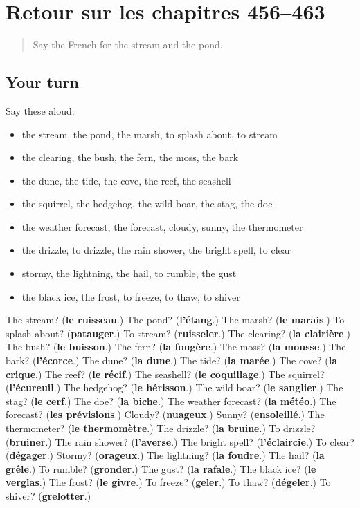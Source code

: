 \section[(dialogue)]{Retour sur les chapitres 456–463}

\label{lesson:FR-R463-revision-456-463}



\begin{quote}
Say the French for the stream and the pond.
\end{quote}

\subsection*{Your turn}
Say these aloud:

\begin{itemize}
\raggedright
  \item the stream, the pond, the marsh, to splash about, to stream
  \item the clearing, the bush, the fern, the moss, the bark
  \item the dune, the tide, the cove, the reef, the seashell
  \item the squirrel, the hedgehog, the wild boar, the stag, the doe
  \item the weather forecast, the forecast, cloudy, sunny, the thermometer
  \item the drizzle, to drizzle, the rain shower, the bright spell, to clear
  \item stormy, the lightning, the hail, to rumble, the gust
  \item the black ice, the frost, to freeze, to thaw, to shiver
\end{itemize}

\begin{tcolorbox}[breakable,colback=teal!4,colframe=teal!35!black,title={Before you move on}]
The stream? (\textbf{le ruisseau}.) The pond? (\textbf{l'étang}.) The marsh? (\textbf{le marais}.) To splash about? (\textbf{patauger}.) To stream? (\textbf{ruisseler}.) The clearing? (\textbf{la clairière}.) The bush? (\textbf{le buisson}.) The fern? (\textbf{la fougère}.) The moss? (\textbf{la mousse}.) The bark? (\textbf{l'écorce}.) The dune? (\textbf{la dune}.) The tide? (\textbf{la marée}.) The cove? (\textbf{la crique}.) The reef? (\textbf{le récif}.) The seashell? (\textbf{le coquillage}.) The squirrel? (\textbf{l'écureuil}.) The hedgehog? (\textbf{le hérisson}.) The wild boar? (\textbf{le sanglier}.) The stag? (\textbf{le cerf}.) The doe? (\textbf{la biche}.) The weather forecast? (\textbf{la météo}.) The forecast? (\textbf{les prévisions}.) Cloudy? (\textbf{nuageux}.) Sunny? (\textbf{ensoleillé}.) The thermometer? (\textbf{le thermomètre}.) The drizzle? (\textbf{la bruine}.) To drizzle? (\textbf{bruiner}.) The rain shower? (\textbf{l'averse}.) The bright spell? (\textbf{l'éclaircie}.) To clear? (\textbf{dégager}.) Stormy? (\textbf{orageux}.) The lightning? (\textbf{la foudre}.) The hail? (\textbf{la grêle}.) To rumble? (\textbf{gronder}.) The gust? (\textbf{la rafale}.) The black ice? (\textbf{le verglas}.) The frost? (\textbf{le givre}.) To freeze? (\textbf{geler}.) To thaw? (\textbf{dégeler}.) To shiver? (\textbf{grelotter}.)
\end{tcolorbox}
